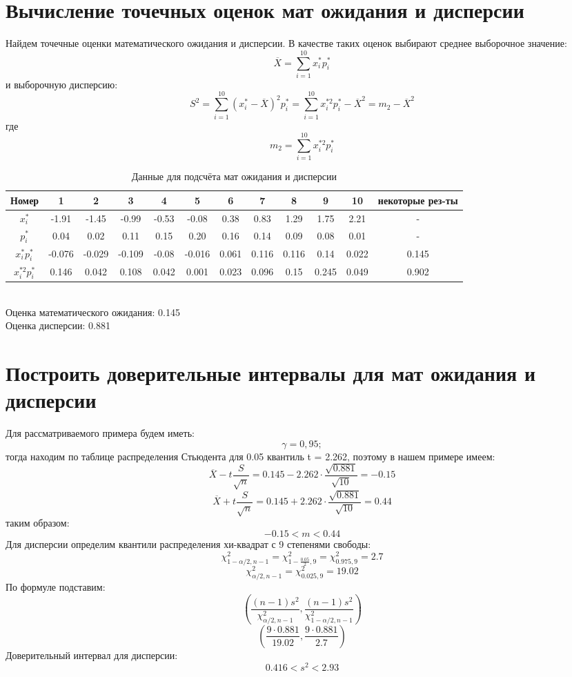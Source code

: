 \documentclass{article}
\begin{document}
\newblock
\section{Вычисление точечных оценок мат ожидания и дисперсии}
Найдем точечные оценки математического ожидания и дисперсии. В качестве таких оценок выбирают среднее выборочное значение:
\[\overline{X} = \sum_{i=1}^{10}x_i^*p_i^*\]
и выборочную дисперсию:
\[S^2 = \sum_{i=1}^{10}(x_i^* - \overline{X})^2p_i^* = \sum_{i=1}^{10}x_i^{*2}p_i^* - \overline{X}^2 = m_2 - \overline{X}^2\]
где
\[m_2 = \sum_{i=1}^{10}x_i^{*2}p_i^*\]
\begin{table}[h]
    \begin{tabular}{|*{12}{c|}}
        \hline
        Номер & 1  & 2  & 3  & 4  & 5  & 6  & 7  & 8  & 9  & 10& некоторые рез-ты \\
        \hline
        $x_i^*$& -1.91 & -1.45 & -0.99 & -0.53 & -0.08 & 0.38 & 0.83 & 1.29 & 1.75 & 2.21 & -\\
        \hline
        $p_i^*$& 0.04 & 0.02 & 0.11 & 0.15 & 0.20 & 0.16 & 0.14 & 0.09 & 0.08 & 0.01& -\\
        \hline
        $x_i^{*}p_i^*$& -0.076 & -0.029 & -0.109 & -0.08 & -0.016 & 0.061 & 0.116 & 0.116 & 0.14 & 0.022 & 0.145\\
        \hline
        $x_i^{*2}p_i^*$& 0.146 & 0.042 & 0.108 & 0.042 & 0.001 & 0.023 & 0.096 & 0.15 & 0.245 & 0.049 & 0.902\\
        \hline
    \end{tabular}
    \caption{Данные для подсчёта мат ожидания и дисперсии}
\end{table}
\\
Оценка математического ожидания: 0.145\\
Оценка дисперсии: 0.881
\newblock

\section{Построить доверительные интервалы для мат ожидания и дисперсии}
Для рассматриваемого примера будем иметь:
\[\gamma = 0,95;\]
тогда находим по таблице распределения Стьюдента для 0.05 квантиль  t = 2.262, поэтому в нашем примере имеем:
\[\overline{X}-t\frac{S}{\sqrt{n}} = 0.145 - 2.262 \cdot\frac{\sqrt{0.881}}{\sqrt{10}} = -0.15\]
\[\overline{X}+t\frac{S}{\sqrt{n}} = 0.145 + 2.262 \cdot\frac{\sqrt{0.881}}{\sqrt{10}} = 0.44\]
таким образом:
\[-0.15 < m < 0.44\]
Для дисперсии определим квантили распределения хи-квадрат с 9 степенями свободы:
\[
\chi^2_{1-\alpha/2, n-1} = \chi^2_{1-\frac{0.05}{2}, 9} = \chi^2_{0.975, 9} = 2.7
\]
\[
\chi^2_{\alpha/2, n-1} = \chi^2_{0.025, 9} = 19.02
\]
По формуле подставим:
\[
\left(\frac{{(n-1)s^2}}{{\chi^2_{\alpha/2, n-1}}}, \frac{{(n-1)s^2}}{{\chi^2_{1-\alpha/2, n-1}}} \right)
\]
\[
\left( \frac{{9\cdot 0.881}}{19.02 }, \frac{{9\cdot 0.881}}{2.7} \right)
\]
Доверительный интервал для дисперсии:
\[ 0.416 < s^2 < 2.93\]
\end{document}
